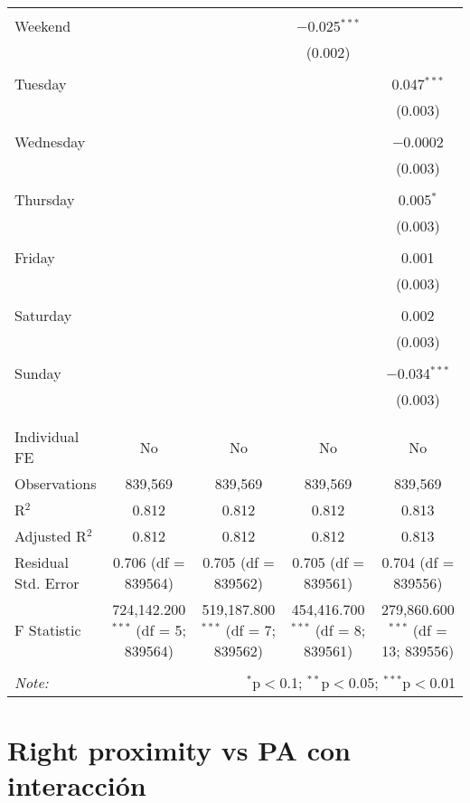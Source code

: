 \documentclass[
]{article}
\begin{document}
\begin{table}[!htbp]
{\begin{tabular}{@{\extracolsep{5pt}}lcccc}
  & & & & \\ 
 Weekend &  &  & $-$0.025$^{***}$ &  \\ 
  &  &  & (0.002) &  \\ 
  & & & & \\ 
 Tuesday &  &  &  & 0.047$^{***}$ \\ 
  &  &  &  & (0.003) \\ 
  & & & & \\ 
 Wednesday &  &  &  & $-$0.0002 \\ 
  &  &  &  & (0.003) \\ 
  & & & & \\ 
 Thursday &  &  &  & 0.005$^{*}$ \\ 
  &  &  &  & (0.003) \\ 
  & & & & \\ 
 Friday &  &  &  & 0.001 \\ 
  &  &  &  & (0.003) \\ 
  & & & & \\ 
 Saturday &  &  &  & 0.002 \\ 
  &  &  &  & (0.003) \\ 
  & & & & \\ 
 Sunday &  &  &  & $-$0.034$^{***}$ \\ 
  &  &  &  & (0.003) \\ 
  & & & & \\ 
\hline \\[-1.8ex] 
Individual FE & No & No & No & No \\ 
Observations & 839,569 & 839,569 & 839,569 & 839,569 \\ 
R$^{2}$ & 0.812 & 0.812 & 0.812 & 0.813 \\ 
Adjusted R$^{2}$ & 0.812 & 0.812 & 0.812 & 0.813 \\ 
Residual Std. Error & 0.706 (df = 839564) & 0.705 (df = 839562) & 0.705 (df = 839561) & 0.704 (df = 839556) \\ 
F Statistic & 724,142.200$^{***}$ (df = 5; 839564) & 519,187.800$^{***}$ (df = 7; 839562) & 454,416.700$^{***}$ (df = 8; 839561) & 279,860.600$^{***}$ (df = 13; 839556) \\ 
\hline 
\hline \\[-1.8ex] 
\textit{Note:}  & \multicolumn{4}{r}{$^{*}$p$<$0.1; $^{**}$p$<$0.05; $^{***}$p$<$0.01} \\ 
\end{tabular}
} 
\end{table} 
\newpage
\section{Right proximity vs PA con interacción}
\end{document}
